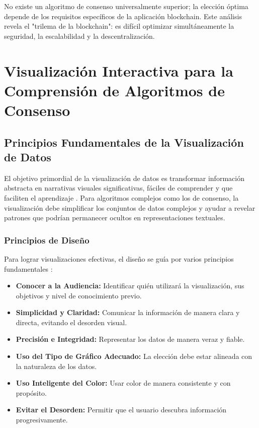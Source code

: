 \documentclass[spanish,12pt,letterpaper]{report}
\begin{document}
No existe un algoritmo de consenso universalmente superior; la elección óptima depende de los requisitos específicos de la aplicación blockchain. Este análisis revela el "trilema de la blockchain": es difícil optimizar simultáneamente la seguridad, la escalabilidad y la descentralización.

\section{Visualización Interactiva para la Comprensión de Algoritmos de Consenso}

\subsection{Principios Fundamentales de la Visualización de Datos}

El objetivo primordial de la visualización de datos es transformar información abstracta en narrativas visuales significativas, fáciles de comprender y que faciliten el aprendizaje \parencite{dev3lop2025visualization}. Para algoritmos complejos como los de consenso, la visualización debe simplificar los conjuntos de datos complejos y ayudar a revelar patrones que podrían permanecer ocultos en representaciones textuales.

\subsubsection{Principios de Diseño}

Para lograr visualizaciones efectivas, el diseño se guía por varios principios fundamentales \parencite{thoughtspot2025principles}:

\begin{itemize}
    \item \textbf{Conocer a la Audiencia:} Identificar quién utilizará la visualización, sus objetivos y nivel de conocimiento previo.
    \item \textbf{Simplicidad y Claridad:} Comunicar la información de manera clara y directa, evitando el desorden visual.
    \item \textbf{Precisión e Integridad:} Representar los datos de manera veraz y fiable.
    \item \textbf{Uso del Tipo de Gráfico Adecuado:} La elección debe estar alineada con la naturaleza de los datos.
    \item \textbf{Uso Inteligente del Color:} Usar color de manera consistente y con propósito.
    \item \textbf{Evitar el Desorden:} Permitir que el usuario descubra información progresivamente.
\end{itemize}
\end{document}
